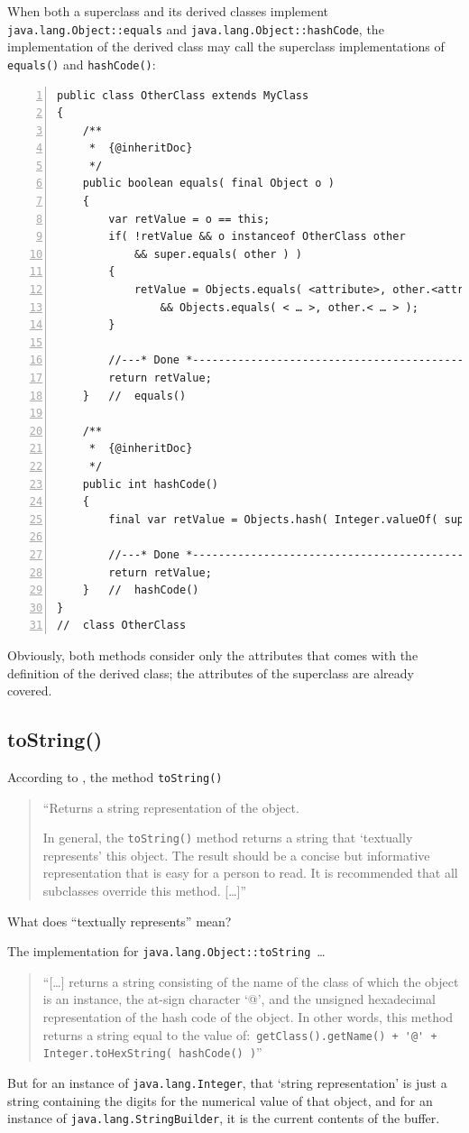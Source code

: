 \documentclass[11pt,a4paper, titlepage, parskip=half, headsepline, footsepline, cleardoublepage=current, headheight=1cm]{scrbook}
\begin{document}
When both a superclass and its derived classes implement \lstinline|java.lang.Object::equals| and \lstinline|java.lang.Object::hashCode|, the implementation of the derived class may call the superclass implementations of \lstinline|equals()| and \lstinline|hashCode()|:
\begin{lstlisting}[numbers=left]
public class OtherClass extends MyClass
{
    /**
     *  {@inheritDoc}
     */
    public boolean equals( final Object o )
    {
        var retValue = o == this;
        if( !retValue && o instanceof OtherClass other
            && super.equals( other ) )
        {
            retValue = Objects.equals( <attribute>, other.<attribute> )
                && Objects.equals( < … >, other.< … > );
        }
            
        //---* Done *------------------------------------------------
        return retValue;
    }   //  equals()
    
    /**
     *  {@inheritDoc}
     */
    public int hashCode()
    {
        final var retValue = Objects.hash( Integer.valueOf( super.hashCode ), <attribute>, < … > );
        
        //---* Done *------------------------------------------------
        return retValue;
    }   //  hashCode()    
}
//  class OtherClass
\end{lstlisting}
Obviously, both methods consider only the attributes that comes with the definition of the derived class; the attributes of the superclass are already covered.

\subsection{toString()}\label{sec:ToString}
According to \autocite{ORACLE_DOC_OBJECT_CLASS:toString}, the method \lstinline|toString()|
\begin{quotation}
“Returns a string representation of the object.

In general, the \lstinline|toString()| method returns a string that ‘textually represents’ this object. The result should be a concise but informative representation that is easy for a person to read. It is recommended that all subclasses override this method. […]”
\end{quotation}

What does “textually represents” mean?

The implementation for \lstinline|java.lang.Object::toString|~…
\begin{quotation}
“[…] returns a string consisting of the name of the class of which the object is an instance, the at-sign character ‘@’, and the unsigned hexadecimal representation of the hash code of the object. In other words, this method returns a string equal to the value of:\
\lstinline|getClass().getName() + '@' + Integer.toHexString( hashCode() )|”
\end{quotation}
But for an instance of \lstinline|java.lang.Integer|\autocite{ORACLE_DOC_INTEGER_CLASS}, that ‘string representation’ is just a string containing the digits for the numerical value of that object, and for an instance of \lstinline|java.lang.StringBuilder|\autocite{ORACLE_DOC_STRINGBUILDER_CLASS}, it is the current contents of the buffer.
\end{document}
